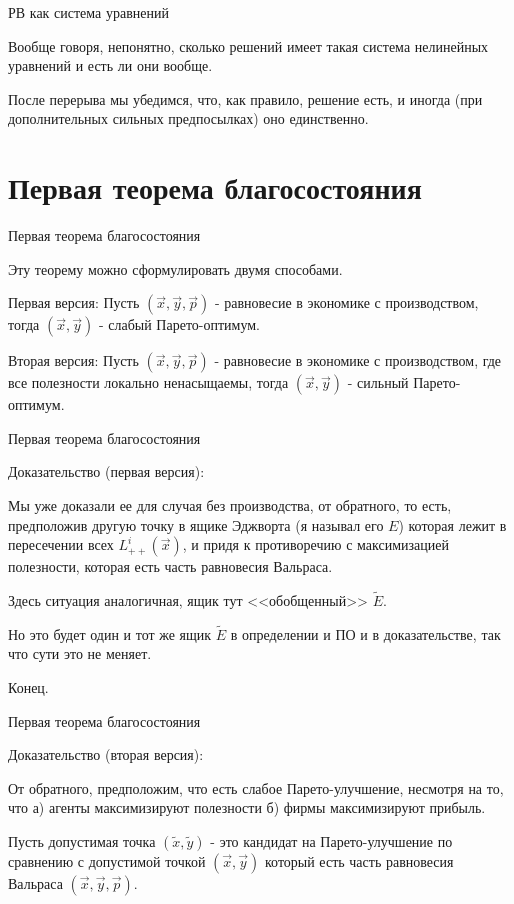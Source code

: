 \documentclass{beamer}
\begin{document}
\begin{frame}{РВ как система уравнений}

Вообще говоря, непонятно, сколько решений имеет такая система нелинейных уравнений и есть ли они вообще. 

После перерыва мы убедимся, что, как правило, решение есть, и иногда (при дополнительных сильных предпосылках) оно единственно.
\end{frame}

\section{Первая теорема благосостояния}

\begin{frame}{Первая теорема благосостояния}

Эту теорему можно сформулировать двумя способами.

\alert{Первая версия}: Пусть $(\vec x, \vec y, \vec p)$ - равновесие в экономике с производством, тогда $(\vec x, \vec y)$ - \alert{слабый} Парето-оптимум.

\alert{Вторая версия}: Пусть $(\vec x, \vec y, \vec p)$ - равновесие в экономике с производством, где все полезности \alert{локально ненасыщаемы}, тогда $(\vec x, \vec y)$ - \alert{сильный} Парето-оптимум.

\end{frame}

\begin{frame}{Первая теорема благосостояния}

\alert{Доказательство (первая версия)}: 

Мы уже доказали ее для случая без производства, от обратного, то есть, предположив другую точку в ящике Эджворта (я называл его $E$) которая лежит в пересечении всех $L^i_{++}(\vec x)$, и придя к противоречию с максимизацией полезности, которая есть часть равновесия Вальраса. 

Здесь ситуация аналогичная, ящик тут <<обобщенный>> $\tilde E$. 

Но это будет один и тот же ящик $\tilde E$ в определении и ПО и в доказательстве, так что сути это не меняет.

Конец.

\end{frame}

\begin{frame}{Первая теорема благосостояния}

\alert{Доказательство (вторая версия)}: 

От обратного, предположим, что есть слабое Парето-улучшение, несмотря на то, что а) агенты максимизируют полезности б) фирмы максимизируют прибыль.

Пусть допустимая точка $(\tilde x, \tilde y)$ - это кандидат на Парето-улучшение по сравнению с допустимой точкой $(\vec x, \vec y)$ который есть часть равновесия Вальраса $(\vec x,\vec y,\vec p)$. 

\end{frame}
\end{document}
